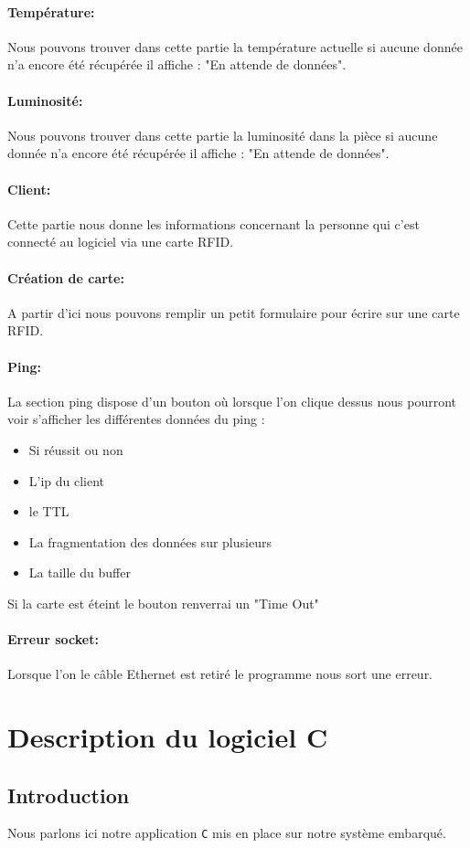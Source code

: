 \documentclass[12pt,a4paper]{report}
\begin{document}
			\paragraph{Température:}Nous pouvons trouver dans cette partie la température actuelle si aucune donnée n'a encore été récupérée il affiche : "En attende de données".
			\paragraph{Luminosité:}Nous pouvons trouver dans cette partie la luminosité dans la pièce si aucune donnée n'a encore été récupérée il affiche : "En attende de données".
			\paragraph{Client:}Cette partie nous donne les informations concernant la personne qui c'est connecté au logiciel via une carte RFID.
			\paragraph{Création de carte:}A partir d'ici nous pouvons remplir un petit formulaire pour écrire sur une carte RFID.
			\paragraph{Ping:}La section ping dispose d'un bouton où lorsque l'on clique dessus nous pourront voir s'afficher les différentes données du ping : 
			\begin{itemize}
			\item Si réussit ou non
			\item L'ip du client
			\item le TTL
			\item La fragmentation des données sur plusieurs
			\item La taille du buffer
			\end{itemize}
			Si la carte est éteint le bouton renverrai un "Time Out"
			\paragraph{Erreur socket:} Lorsque l'on le câble Ethernet est retiré le programme nous sort une erreur.
	
	\section{Description du logiciel C} 
		\subsection{Introduction}
		Nous parlons ici notre application \verb+C+ mis en place sur notre système embarqué. 
\end{document}
